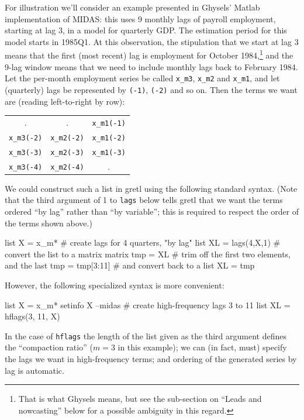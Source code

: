 For illustration we'll consider an example presented in Ghysels'
\textsf{Matlab} implementation of MIDAS: this uses 9 monthly lags of
payroll employment, starting at lag 3, in a model for quarterly GDP.
The estimation period for this model starts in 1985Q1. At this
observation, the stipulation that we start at lag 3 means that the
first (most recent) lag is employment for October 1984,\footnote{That
  is what Ghysels means, but see the sub-section on ``Leads and
  nowcasting'' below for a possible ambiguity in this regard.} and the
9-lag window means that we need to include monthly lags back to
February 1984. Let the per-month employment series be called
\texttt{x\_m3}, \texttt{x\_m2} and \texttt{x\_m1}, and let (quarterly)
lags be represented by \texttt{(-1)}, \texttt{(-2)} and so on. Then
the terms we want are (reading left-to-right by row):
\begin{center}
{\small
\begin{tabular}{ccc}
 . & . & \texttt{x\_m1(-1)} \\
\texttt{x\_m3(-2)} & \texttt{x\_m2(-2)} & \texttt{x\_m1(-2)} \\
\texttt{x\_m3(-3)} & \texttt{x\_m2(-3)} & \texttt{x\_m1(-3)} \\
\texttt{x\_m3(-4)} & \texttt{x\_m2(-4)} & .
\end{tabular}
}
\end{center}

We could construct such a list in gretl using the following
standard syntax. (Note that the third argument of 1 to
\texttt{lags} below tells gretl that we want the terms ordered ``by
lag'' rather than ``by variable''; this is required to respect the
order of the terms shown above.)
\begin{code}
list X = x_m*
# create lags for 4 quarters, "by lag"
list XL = lags(4,X,1)
# convert the list to a matrix
matrix tmp = XL
# trim off the first two elements, and the last
tmp = tmp[3:11]
# and convert back to a list
XL = tmp
\end{code}

However, the following specialized syntax is more convenient:
\begin{code}
list X = x_m*
setinfo X --midas
# create high-frequency lags 3 to 11
list XL = hflags(3, 11, X)
\end{code}

In the case of \texttt{hflags} the length of the list given as the
third argument defines the ``compaction ratio'' ($m=3$ in this
example); we can (in fact, must) specify the lags we want in
high-frequency terms; and ordering of the generated series by lag is
automatic. 

